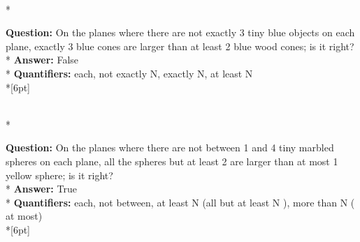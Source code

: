 \begin{figure*}
\begin{minipage}{0.48\textwidth}
\begin{minipage}[t][2.2cm][t]{1\textwidth}
    \end{minipage}\\*
    \begin{minipage}[t][2.2cm][t]{1\textwidth}
      \footnotesize
      \textbf{Question:}  On the planes where there are not exactly 3 tiny blue objects on each plane, exactly 3 blue cones are larger than at least 2 blue wood cones; is it right? \\*
      \textbf{Answer:}  False \\*
      \textbf{Quantifiers:} each, not exactly N, exactly N, at least N \\*[6pt]
    \end{minipage}\\*
    \begin{minipage}[t][2.2cm][t]{1\textwidth}
      \footnotesize
      \textbf{Question:} On the planes where there are not between 1 and 4 tiny marbled spheres on each plane, all the spheres but at least 2 are larger than at most 1 yellow sphere; is it right? \\*
      \textbf{Answer:} True \\*
      \textbf{Quantifiers:} each, not between, at least N (all but at least N ), more than N ( at most) \\*[6pt]
    \end{minipage}
  \end{minipage}
  \vspace{0.2cm}
  

\end{figure*}
